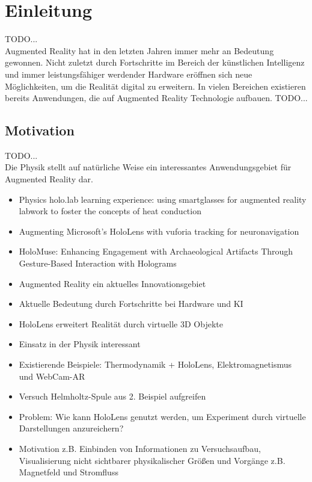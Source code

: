 \section{Einleitung}
\label{sec-1}
TODO...\\
Augmented Reality hat in den letzten Jahren immer mehr an Bedeutung gewonnen. Nicht zuletzt durch Fortschritte im Bereich der künstlichen Intelligenz und immer leistungsfähiger werdender Hardware eröffnen sich neue Möglichkeiten, um die Realität digital zu erweitern. In vielen Bereichen existieren bereits Anwendungen, die auf Augmented Reality Technologie aufbauen. 
TODO...\\

\subsection{Motivation}
\label{sec-1-1}
TODO...\\
Die Physik stellt auf natürliche Weise ein interessantes Anwendungsgebiet für Augmented Reality dar. 

\begin{itemize}
	\item Physics holo.lab learning experience: using smartglasses for augmented reality labwork to foster the concepts of heat conduction \cite{Strzys18}
	\item Augmenting Microsoft's HoloLens with vuforia tracking for neuronavigation \cite{Frantz18}
	\item HoloMuse: Enhancing Engagement with Archaeological Artifacts Through Gesture-Based Interaction with Holograms \cite{Pollalis17}
\end{itemize}

\begin{itemize}
	\item Augmented Reality ein aktuelles Innovationsgebiet
	\item Aktuelle Bedeutung durch Fortschritte bei Hardware und KI
	\item HoloLens erweitert Realität durch virtuelle 3D Objekte
	\item Einsatz in der Physik interessant
	\item Existierende Beispiele: Thermodynamik + HoloLens, Elektromagnetismus und WebCam-AR
	\item Versuch Helmholtz-Spule aus 2. Beispiel aufgreifen
	\item Problem: Wie kann HoloLens genutzt werden, um Experiment durch virtuelle Darstellungen anzureichern?
	\item Motivation z.B. Einbinden von Informationen zu Versuchsaufbau, Visualisierung nicht sichtbarer physikalischer Größen und Vorgänge z.B. Magnetfeld und Stromfluss
\end{itemize}

